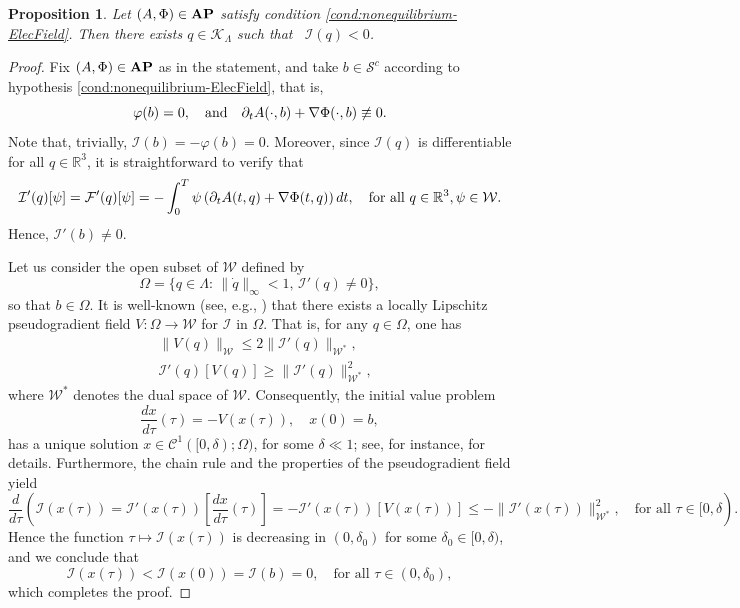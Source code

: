 \documentclass{article}
\newcommand{\boC}{\mathcal{C}}
\newcommand{\boK}{\mathcal{K}}
\newcommand{\boI}{\mathcal{I}}
\newcommand{\R}{\mathbb{R}}
\newcommand{\boW}{\mathcal{W}}
\newcommand{\boF}{\mathcal{F}}
\newcommand{\boS}{\mathcal{S}}
\newcommand{\dq}{\dot{q}}
\newcommand{\AP}{\textnormal{\textbf{AP}}}
\newtheorem{proposition}{Proposition}[section]
\theoremstyle{definition}
\begin{document}
\begin{proposition}\label{MainTheorem3'}
	Let $(A,\Phi)\in\AP$ satisfy condition \eqref{cond:nonequilibrium-ElecField}. Then there exists $q\in\boK_\Lambda$ such that ~$\boI(q)<0$. 
\end{proposition}
\begin{proof}
Fix $(A,\Phi)\in\AP$ as in the statement, and take $b\in\boS^c$ according to hypothesis \eqref{cond:nonequilibrium-ElecField}, that is,
\begin{equation}
    \varphi(b)=0,\quad\hbox{and}\quad\partial_t A(\cdot,b)+\nabla\Phi(\cdot,b)\not\equiv0.
\end{equation}
Note that, trivially, $\boI(b)=-\varphi(b)=0$. Moreover, since $\boI(q)$ is differentiable for all $q\in\R^3$, it is straightforward to verify that
\begin{equation*}
    \boI'(q)[\psi]=\boF'(q)[\psi]=-\int_0^T\psi\left(\partial_t A(t,q)+\nabla\Phi(t,q)\right)dt,\quad\hbox{for all }q\in\R^3, \psi\in\boW.
\end{equation*}
Hence, $\boI'(b)\neq0$.

Let us consider the open subset of $\boW$ defined by
\[\Omega=\{q\in\Lambda:\, \|\dq\|_\infty<1,\, \boI'(q)\not=0\},\]
so that $b\in\Omega$. It is well-known (see, e.g., \cite[Lemma 2.2]{Willem}) that there exists a locally Lipschitz pseudogradient field $V:\Omega\to \boW$ for $\boI$ in $\Omega$. That is, for any $q\in\Omega$, one has
\begin{align}
    &\|V(q)\|_\boW\leq 2\|\boI'(q)\|_{\boW^*},
    \\
    &\boI'(q)[V(q)]\geq \|\boI'(q)\|^2_{\boW^*},
\end{align}
where $\boW^*$ denotes the dual space of $\boW$. Consequently, the initial value problem
\begin{equation}\label{eq:ivproblem}
	\frac{dx}{d\tau}(\tau)=-V(x(\tau)),\quad x(0)=b,
\end{equation}
has a unique solution $x\in\boC^1([0,\delta);\Omega)$, for some $\delta\ll1$; see, for instance, \cite{Deim} for details. Furthermore, the chain rule and the properties of the pseudogradient field yield
\begin{equation}\label{eq:derivative-1}
	\frac{d}{d\tau}(\boI(x(\tau))= \boI'(x(\tau))\left[\frac{dx}{d\tau}(\tau)\right]= -\boI'(x(\tau))\left[V(x(\tau))\right]\leq -\|\boI'(x(\tau))\|_{\boW^*}^2,\quad\text{for all }\tau\in [0,\delta).
\end{equation}
Hence the function $\tau\mapsto \boI(x(\tau))$ is decreasing in $(0,\delta_0)$ for some $\delta_0\in [0,\delta)$, and we conclude that
\begin{equation}
	\boI(x(\tau))<\boI(x(0))=\boI(b)= 0,\quad\text{for all }\tau\in (0,\delta_0),
\end{equation}
which completes the proof.
\end{proof}
\end{document}
